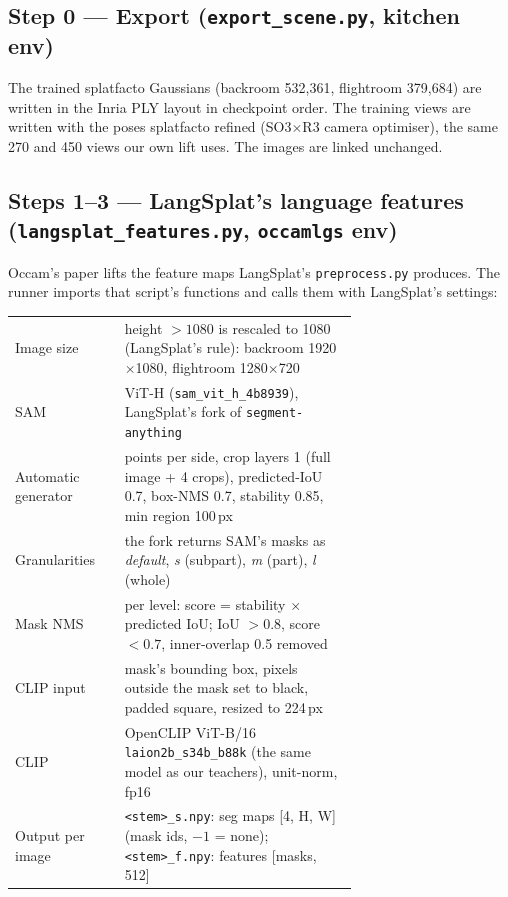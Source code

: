\documentclass[11pt,a4paper]{article}
\newcommand{\code}[1]{\texttt{\small #1}}
\begin{document}
\subsection*{Step 0 --- Export (\code{export\_scene.py}, kitchen env)}
The trained splatfacto Gaussians (backroom 532,361, flightroom 379,684) are written in the Inria PLY layout in checkpoint
order. The training views are written with the poses splatfacto refined (SO3$\times$R3 camera optimiser), the same 270 and
450 views our own lift uses. The images are linked unchanged.

\subsection*{Steps 1--3 --- LangSplat's language features (\code{langsplat\_features.py}, \code{occamlgs} env)}
Occam's paper lifts the feature maps LangSplat's \code{preprocess.py} produces. The runner imports that script's functions
and calls them with LangSplat's settings:
\begin{center}\small
\begin{tabular}{l>{\raggedright\arraybackslash}p{0.68\linewidth}}
\toprule
Image size & height $>1080$ is rescaled to 1080 (LangSplat's rule): backroom 1920$\times$1080, flightroom 1280$\times$720\\
SAM & ViT-H (\code{sam\_vit\_h\_4b8939}), LangSplat's fork of \code{segment-anything}\\
Automatic generator & 32 points per side, crop layers 1 (full image + 4 crops), predicted-IoU 0.7, box-NMS 0.7, stability 0.85, min region 100\,px\\
Granularities & the fork returns SAM's masks as \emph{default}, \emph{s} (subpart), \emph{m} (part), \emph{l} (whole)\\
Mask NMS & per level: score = stability $\times$ predicted IoU; IoU $>0.8$, score $<0.7$, inner-overlap 0.5 removed\\
CLIP input & mask's bounding box, pixels outside the mask set to black, padded square, resized to 224\,px\\
CLIP & OpenCLIP ViT-B/16 \code{laion2b\_s34b\_b88k} (the same model as our teachers), unit-norm, fp16\\
Output per image & \code{<stem>\_s.npy}: seg maps [4, H, W] (mask ids, $-1$ = none); \code{<stem>\_f.npy}: features [masks, 512]\\
\bottomrule
\end{tabular}
\end{center}
\end{document}
